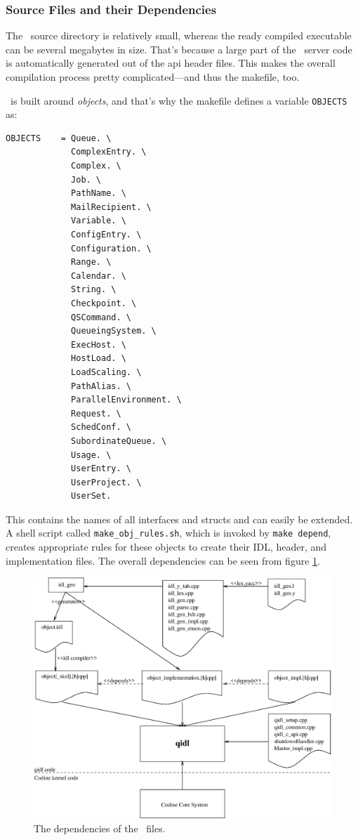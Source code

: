 \subsubsection{Source Files and their Dependencies}
The \qidl\ source directory is relatively small, whereas the ready compiled
executable can be several megabytes in size. That's because a large part of
the \qidl\ server code is automatically generated out of the api header
files. This makes the overall compilation process pretty complicated---and
thus the makefile, too.

\qidl\ is built around \emph{objects}, and that's why the makefile defines a
variable \texttt{OBJECTS} as:
\begin{Verbatim}[fontsize=\small, frame=single]
OBJECTS    = Queue. \
             ComplexEntry. \
             Complex. \
             Job. \
             PathName. \
             MailRecipient. \
             Variable. \
             ConfigEntry. \
             Configuration. \
             Range. \
             Calendar. \
             String. \
             Checkpoint. \
             QSCommand. \
             QueueingSystem. \
             ExecHost. \
             HostLoad. \
             LoadScaling. \
             PathAlias. \
             ParallelEnvironment. \
             Request. \
             SchedConf. \
             SubordinateQueue. \
             Usage. \
             UserEntry. \
             UserProject. \
             UserSet.
\end{Verbatim}
This contains the names of all interfaces and structs and can easily be
extended. A shell script called \texttt{make\_obj\_rules.sh}, which is
invoked by \texttt{make depend}, creates appropriate rules for these objects
to create their IDL, header, and implementation files. The overall dependencies
can be seen from figure \ref{f_prog_dependencies}.

\begin{figure}[b!]
\includegraphics[width=\textwidth]{filedep.eps}
\caption{\label{f_prog_dependencies}The dependencies of the \qidl\ files.}
\end{figure}

